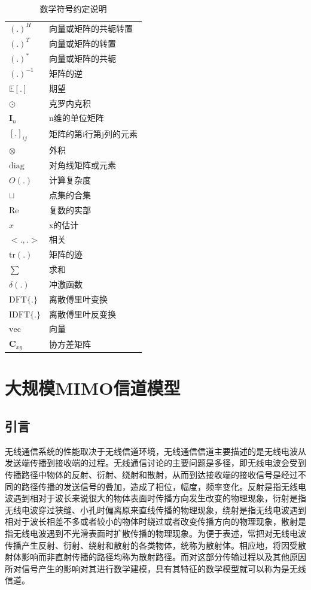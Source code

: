 \documentclass[bachelor,nocolorlinks, printoneside]{seuthesis} %
\begin{document}
\begin{Main}
\begin{table}[htbp]
	\centering
	\caption{\label{tab:symbol}数学符号约定说明}
	\begin{tabular}{ll}
		\toprule
		$(.)^H$ & 向量或矩阵的共轭转置 \\
		$(.)^T$ & 向量或矩阵的转置 \\
		$(.)^*$ & 向量或矩阵的共轭 \\
		$(.)^{-1}$ & 矩阵的逆 \\
		$\mathbb{E}[.]$ & 期望 \\
		$\odot$ & 克罗内克积 \\
		$\mathbf{I}_n$ & n维的单位矩阵  \\
		$[.]_{ij}$ & 矩阵的第i行第j列的元素 \\
		$\otimes$ & 外积 \\
		$\mathrm{diag}$ & 对角线矩阵或元素\\
		$O(.)$ & 计算复杂度 \\
		$\sqcup$ & 点集的合集 \\
		$\mathrm{Re}$ & 复数的实部 \\
		$\hat{x}$ & x的估计 \\
		$<. , .>$ & 相关\\
		$\mathrm{tr}(.)$ & 矩阵的迹 \\
		$\sum$ & 求和 \\
		$\delta(.)$ & 冲激函数 \\
		$\mathrm{DFT}\lbrace.\rbrace$ & 离散傅里叶变换\\
		$\mathrm{IDFT}\lbrace.\rbrace$ & 离散傅里叶反变换\\
		$\mathrm{vec}$ & 向量 \\
		$\mathbf{C}_{xy}$ & 协方差矩阵 \\
		\bottomrule
	\end{tabular}
\end{table}



\chapter{大规模MIMO信道模型}
\section{引言}
无线通信系统的性能取决于无线信道环境，无线通信信道主要描述的是无线电波从发送端传播到接收端的过程。无线通信讨论的主要问题是多径，即无线电波会受到传播路径中物体的反射、衍射、绕射和散射，从而到达接收端的接收信号是经过不同的路径传播的发送信号的叠加，造成了相位，幅度，频率变化。反射是指无线电波遇到相对于波长来说很大的物体表面时传播方向发生改变的物理现象，衍射是指无线电波穿过狭缝、小孔时偏离原来直线传播的物理现象，绕射是指无线电波遇到相对于波长相差不多或者较小的物体时绕过或者改变传播方向的物理现象，散射是指无线电波遇到不光滑表面时扩散传播的物理现象。为便于表述，常把对无线电波传播产生反射、衍射、绕射和散射的各类物体，统称为散射体。相应地，将因受散射体影响而非直射传播的路径均称为散射路径。而对这部分传输过程以及其他原因所对信号产生的影响对其进行数学建模，具有其特征的数学模型就可以称为是无线信道。


\end{Main}
\end{document}
